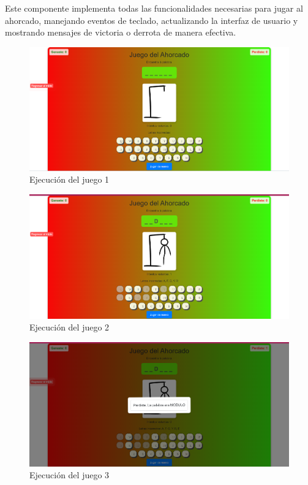 \documentclass{article}
\begin{document}
\begin{itemize}
Este componente implementa todas las funcionalidades necesarias para jugar al ahorcado, manejando eventos de teclado, actualizando la interfaz de usuario y mostrando mensajes de victoria o derrota de manera efectiva.



\begin{figure}[h]
    \centering
    \includegraphics[width=1\textwidth]{img/game1.png}
    \caption{Ejecución del juego 1}
    \label{fig:game1}
\end{figure}

\begin{figure}[h]
    \centering
    \includegraphics[width=1.2\textwidth]{img/game2.png}
    \caption{Ejecución del juego 2}
    \label{fig:game2}
\end{figure}

\begin{figure}[h]
    \centering
    \includegraphics[width=1\textwidth]{img/game3.png}
    \caption{Ejecución del juego 3}
    \label{fig:game3}
\end{figure}


\end{itemize}
\end{document}

